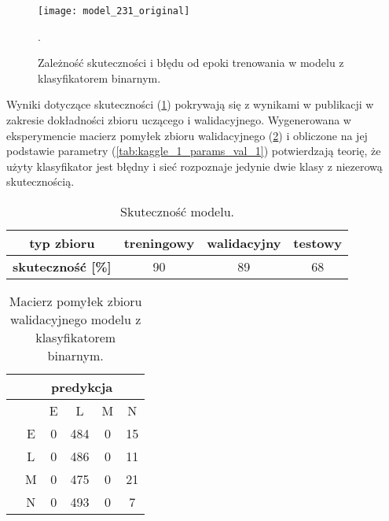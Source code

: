 {\begin{itemize}
\begin{figure}[h!]
	\centering
	\centering
		\texttt{[image: model\_231\_original]}	
	\caption{Zależność skuteczności i błędu od epoki trenowania w modelu z klasyfikatorem binarnym.}.
	\label{fig:kaggle_1_acc_loss_trening}
\end{figure}

Wyniki dotyczące skuteczności (\ref{tab:kaggle_1_acc}) pokrywają się z wynikami w publikacji w zakresie dokładności zbioru uczącego i walidacyjnego. Wygenerowana w eksperymencie macierz pomyłek zbioru walidacyjnego (\ref{tab:kaggle_1_conf_matrix_val_1}) i obliczone na jej podstawie parametry (\ref{tab:kaggle_1_params_val_1}) potwierdzają teorię, że użyty klasyfikator jest błędny i sieć rozpoznaje jedynie dwie klasy z niezerową skutecznością.

\begin{table}[h!]
\centering
\caption[Short Heading]{Skuteczność modelu.}
\label{tab:kaggle_1_acc}
\begin{tabular}{|c|c|c|c|}
\hline
\textbf{typ zbioru}           & \textbf{treningowy} & \textbf{walidacyjny} & \textbf{testowy} \\ \hline
\textbf{skuteczność {[}\%{]}} & 90                  & 89                   & 68               \\ \hline
\end{tabular}
\end{table}

\begin{table}[h!]
\centering
\caption[Short Heading]{Macierz pomyłek zbioru walidacyjnego modelu z klasyfikatorem binarnym.}
\label{tab:kaggle_1_conf_matrix_val_1}
\begin{tabular}{|c|c|c|c|c|c|}
\hline
\textbf{}                           & \multicolumn{5}{c|}{\textbf{predykcja}} \\ \hline
{\multirow{5}{*}{\rotatebox[origin=c]{90}{\textbf{klasa}}}} &         & E       & L        & M      & N       \\ \cline{2-6} 
                                    & E       & 0       & 484      & 0      & 15      \\ \cline{2-6} 
                                    & L       & 0       & 486      & 0      & 11      \\ \cline{2-6} 
                                    & M       & 0       & 475      & 0      & 21      \\ \cline{2-6} 
                                    & N       & 0       & 493      & 0      & 7       \\ \hline
\end{tabular}
\end{table}


\end{itemize}}
